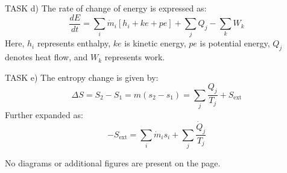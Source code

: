 TASK d)  
The rate of change of energy is expressed as:  
\[
\frac{dE}{dt} = \sum_i \dot{m}_i \left[ h_i + ke + pe \right] + \sum_j Q_j - \sum_k W_k
\]  
Here, \( h_i \) represents enthalpy, \( ke \) is kinetic energy, \( pe \) is potential energy, \( Q_j \) denotes heat flow, and \( W_k \) represents work.  

TASK e)  
The entropy change is given by:  
\[
\Delta S = S_2 - S_1 = m \left( s_2 - s_1 \right) = \sum_j \frac{Q_j}{T_j} + S_{\text{ext}}
\]  
Further expanded as:  
\[
-S_{\text{ext}} = \sum_i \dot{m}_i s_i + \sum_j \frac{\dot{Q}_j}{T_j}
\]  

No diagrams or additional figures are present on the page.